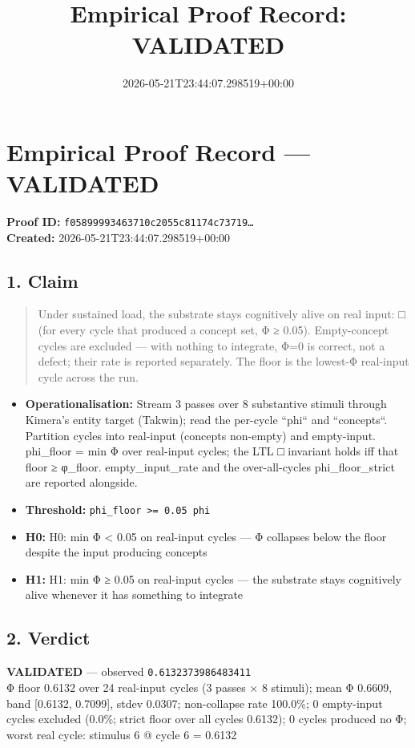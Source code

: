 \documentclass{article}
\title{Empirical Proof Record: VALIDATED}
\date{2026-05-21T23:44:07.298519+00:00}
\begin{document}
\maketitle
\section*{Empirical Proof Record --- \textcolor{validated}{\textbf{VALIDATED}}}
\textbf{Proof ID:} \texttt{f05899993463710c2055c81174c73719\dots}\\
\textbf{Created:} 2026-05-21T23:44:07.298519+00:00
\subsection*{1. Claim}
\begin{quote}Under sustained load, the substrate stays cognitively alive on real input: □ (for every cycle that produced a concept set, Φ ≥ 0.05). Empty-concept cycles are excluded — with nothing to integrate, Φ=0 is correct, not a defect; their rate is reported separately. The floor is the lowest-Φ real-input cycle across the run.\end{quote}
\begin{itemize}
\item \textbf{Operationalisation:} Stream 3 passes over 8 substantive stimuli through Kimera's entity target (Takwin); read the per-cycle ``phi`` and ``concepts``. Partition cycles into real-input (concepts non-empty) and empty-input. phi\_floor = min Φ over real-input cycles; the LTL □ invariant holds iff that floor ≥ φ\_floor. empty\_input\_rate and the over-all-cycles phi\_floor\_strict are reported alongside.
\item \textbf{Threshold:} \texttt{phi\_floor >= 0.05 phi}
\item \textbf{H0:} H0: min Φ < 0.05 on real-input cycles — Φ collapses below the floor despite the input producing concepts
\item \textbf{H1:} H1: min Φ ≥ 0.05 on real-input cycles — the substrate stays cognitively alive whenever it has something to integrate
\end{itemize}
\subsection*{2. Verdict}
\textcolor{validated}{\textbf{VALIDATED}} --- observed \texttt{0.6132373986483411}\\
Φ floor 0.6132 over 24 real-input cycles (3 passes × 8 stimuli); mean Φ 0.6609, band [0.6132, 0.7099], stdev 0.0307; non-collapse rate 100.0\%; 0 empty-input cycles excluded (0.0\%; strict floor over all cycles 0.6132); 0 cycles produced no Φ; worst real cycle: stimulus 6 @ cycle 6 = 0.6132
\end{document}
